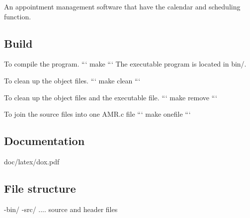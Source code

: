 An appointment management software that have the calendar and scheduling function.

\subsection*{Build }

To compile the program. ``` make ``` The executable program is located in bin/.

To clean up the object files. ``` make clean ```

To clean up the object files and the executable file. ``` make remove ```

To join the source files into one A\+M\+R.\+c file ``` make onefile ```

\subsection*{Documentation }

doc/latex/dox.\+pdf

\subsection*{File structure }

-\/bin/ -\/src/ .... source and header files 